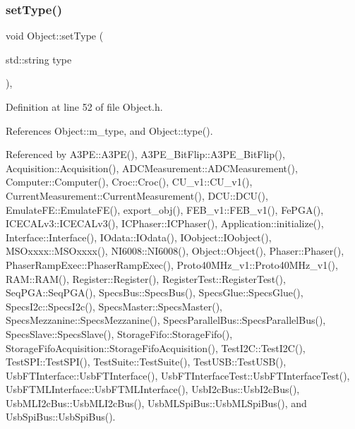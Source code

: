 \subsubsection{\texorpdfstring{set\+Type()}{setType()}}
{\footnotesize\ttfamily void Object\+::set\+Type (\begin{DoxyParamCaption}\item[{std\+::string}]{type }\end{DoxyParamCaption})\hspace{0.3cm}{\ttfamily [inline]}, {\ttfamily [inherited]}}



Definition at line 52 of file Object.\+h.



References Object\+::m\+\_\+type, and Object\+::type().



Referenced by A3\+P\+E\+::\+A3\+P\+E(), A3\+P\+E\+\_\+\+Bit\+Flip\+::\+A3\+P\+E\+\_\+\+Bit\+Flip(), Acquisition\+::\+Acquisition(), A\+D\+C\+Measurement\+::\+A\+D\+C\+Measurement(), Computer\+::\+Computer(), Croc\+::\+Croc(), C\+U\+\_\+v1\+::\+C\+U\+\_\+v1(), Current\+Measurement\+::\+Current\+Measurement(), D\+C\+U\+::\+D\+C\+U(), Emulate\+F\+E\+::\+Emulate\+F\+E(), export\+\_\+obj(), F\+E\+B\+\_\+v1\+::\+F\+E\+B\+\_\+v1(), Fe\+P\+G\+A(), I\+C\+E\+C\+A\+Lv3\+::\+I\+C\+E\+C\+A\+Lv3(), I\+C\+Phaser\+::\+I\+C\+Phaser(), Application\+::initialize(), Interface\+::\+Interface(), I\+Odata\+::\+I\+Odata(), I\+Oobject\+::\+I\+Oobject(), M\+S\+Oxxxx\+::\+M\+S\+Oxxxx(), N\+I6008\+::\+N\+I6008(), Object\+::\+Object(), Phaser\+::\+Phaser(), Phaser\+Ramp\+Exec\+::\+Phaser\+Ramp\+Exec(), Proto40\+M\+Hz\+\_\+v1\+::\+Proto40\+M\+Hz\+\_\+v1(), R\+A\+M\+::\+R\+A\+M(), Register\+::\+Register(), Register\+Test\+::\+Register\+Test(), Seq\+P\+G\+A\+::\+Seq\+P\+G\+A(), Specs\+Bus\+::\+Specs\+Bus(), Specs\+Glue\+::\+Specs\+Glue(), Specs\+I2c\+::\+Specs\+I2c(), Specs\+Master\+::\+Specs\+Master(), Specs\+Mezzanine\+::\+Specs\+Mezzanine(), Specs\+Parallel\+Bus\+::\+Specs\+Parallel\+Bus(), Specs\+Slave\+::\+Specs\+Slave(), Storage\+Fifo\+::\+Storage\+Fifo(), Storage\+Fifo\+Acquisition\+::\+Storage\+Fifo\+Acquisition(), Test\+I2\+C\+::\+Test\+I2\+C(), Test\+S\+P\+I\+::\+Test\+S\+P\+I(), Test\+Suite\+::\+Test\+Suite(), Test\+U\+S\+B\+::\+Test\+U\+S\+B(), Usb\+F\+T\+Interface\+::\+Usb\+F\+T\+Interface(), Usb\+F\+T\+Interface\+Test\+::\+Usb\+F\+T\+Interface\+Test(), Usb\+F\+T\+M\+L\+Interface\+::\+Usb\+F\+T\+M\+L\+Interface(), Usb\+I2c\+Bus\+::\+Usb\+I2c\+Bus(), Usb\+M\+L\+I2c\+Bus\+::\+Usb\+M\+L\+I2c\+Bus(), Usb\+M\+L\+Spi\+Bus\+::\+Usb\+M\+L\+Spi\+Bus(), and Usb\+Spi\+Bus\+::\+Usb\+Spi\+Bus().


